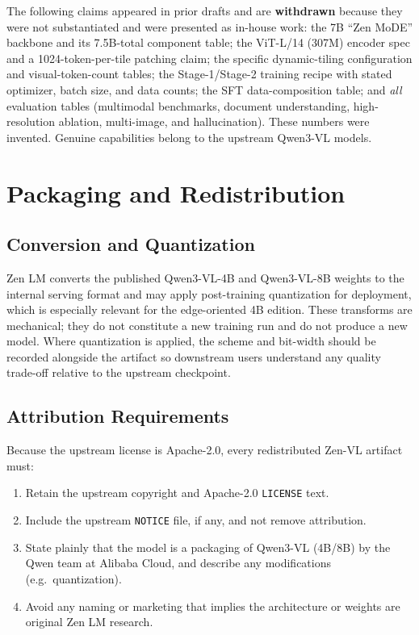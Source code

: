\documentclass[11pt,a4paper]{article}
\begin{document}
The following claims appeared in prior drafts and are \textbf{withdrawn} because they were
not substantiated and were presented as in-house work: the 7B ``Zen MoDE'' backbone and its
7.5B-total component table; the ViT-L/14 (307M) encoder spec and a 1024-token-per-tile
patching claim; the specific dynamic-tiling configuration and visual-token-count tables; the
Stage-1/Stage-2 training recipe with stated optimizer, batch size, and data counts; the SFT
data-composition table; and \emph{all} evaluation tables (multimodal benchmarks, document
understanding, high-resolution ablation, multi-image, and hallucination). These numbers were
invented. Genuine capabilities belong to the upstream Qwen3-VL models.

\section{Packaging and Redistribution}

\subsection{Conversion and Quantization}

Zen LM converts the published Qwen3-VL-4B and Qwen3-VL-8B weights to the internal serving
format and may apply post-training quantization for deployment, which is especially relevant
for the edge-oriented 4B edition. These transforms are mechanical; they do not constitute a
new training run and do not produce a new model. Where quantization is applied, the scheme
and bit-width should be recorded alongside the artifact so downstream users understand any
quality trade-off relative to the upstream checkpoint.

\subsection{Attribution Requirements}

Because the upstream license is Apache-2.0, every redistributed Zen-VL artifact must:

\begin{enumerate}
  \item Retain the upstream copyright and Apache-2.0 \texttt{LICENSE} text.
  \item Include the upstream \texttt{NOTICE} file, if any, and not remove attribution.
  \item State plainly that the model is a packaging of Qwen3-VL (4B/8B) by the Qwen team at
        Alibaba Cloud, and describe any modifications (e.g.\ quantization).
  \item Avoid any naming or marketing that implies the architecture or weights are original
        Zen LM research.
\end{enumerate}
\end{document}
